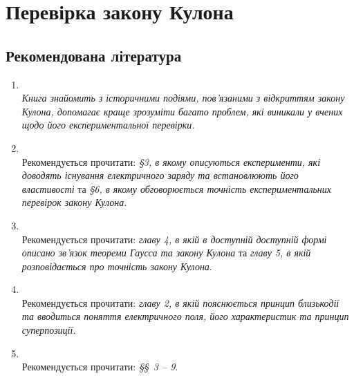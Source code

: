
%
\expandafter\graphicspath\expandafter{\expandafter{\currfilebase/pic}}
\usetikzlibrary{arrows.meta}
\newcommand\Ground{%
\mathbin{\text{\begin{tikzpicture}[circuit ee IEC]
\draw (0,1ex) to (0,0) node[ground,rotate=-90,xshift=.3ex] {};
\end{tikzpicture}}}%
}

\chapter{Перевірка закону Кулона}
\makeworktitle

\section*{Рекомендована література }
\begin{enumerate}
\item {}\\[0.5ex]
    \emph{Книга знайомить з історичними подіями, пов'язаними з відкриттям  закону Кулона, допомагає краще зрозуміти багато проблем, які виникали у вчених щодо його експериментальної перевірки.}\\[0.5ex]
\item {}\\[0.5ex]
    Рекомендується прочитати:  \emph{\S 3, в якому описуються експерименти, які доводять існування електричного заряду та встановлюють його властивості} та \emph{\S 6, в якому обговорюється точність експериментальних перевірок закону Кулона}.\\[0.5ex]
\item {}\\[0.5ex]
    Рекомендується прочитати: \emph{главу 4, в якій в доступній доступній формі описано зв'язок теореми Гаусса та закону Кулона} та \emph{главу 5, в якій розповідається про точність закону Кулона}.\\[0.5ex]
\item {}\\[0.5ex]
    Рекомендується прочитати: \emph{главу 2, в якій пояснюється принцип близькодії та вводиться поняття електричного поля, його характеристик та принцип суперпозиції}.
\item {}\\[0.5ex]
    Рекомендується прочитати: \emph{\S\S~3 -- 9}.
\end{enumerate}


